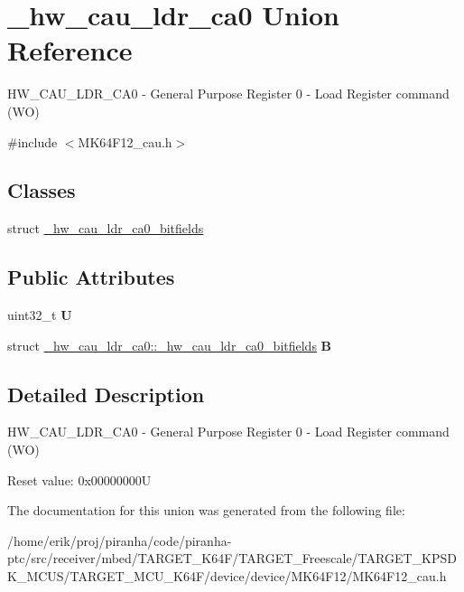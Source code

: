 \hypertarget{union__hw__cau__ldr__ca0}{}\section{\+\_\+hw\+\_\+cau\+\_\+ldr\+\_\+ca0 Union Reference}
\label{union__hw__cau__ldr__ca0}


H\+W\+\_\+\+C\+A\+U\+\_\+\+L\+D\+R\+\_\+\+C\+A0 -\/ General Purpose Register 0 -\/ Load Register command (WO)  




{\ttfamily \#include $<$M\+K64\+F12\+\_\+cau.\+h$>$}

\subsection*{Classes}
\begin{DoxyCompactItemize}
\item 
struct \hyperlink{struct__hw__cau__ldr__ca0_1_1__hw__cau__ldr__ca0__bitfields}{\+\_\+hw\+\_\+cau\+\_\+ldr\+\_\+ca0\+\_\+bitfields}
\end{DoxyCompactItemize}
\subsection*{Public Attributes}
\begin{DoxyCompactItemize}
\item 
uint32\+\_\+t {\bfseries U}\hypertarget{union__hw__cau__ldr__ca0_a4080128ee715578b75b81fc067d07aa3}{}\label{union__hw__cau__ldr__ca0_a4080128ee715578b75b81fc067d07aa3}

\item 
struct \hyperlink{struct__hw__cau__ldr__ca0_1_1__hw__cau__ldr__ca0__bitfields}{\+\_\+hw\+\_\+cau\+\_\+ldr\+\_\+ca0\+::\+\_\+hw\+\_\+cau\+\_\+ldr\+\_\+ca0\+\_\+bitfields} {\bfseries B}\hypertarget{union__hw__cau__ldr__ca0_a01a8ef5d1021d73221511a7ddb9f368a}{}\label{union__hw__cau__ldr__ca0_a01a8ef5d1021d73221511a7ddb9f368a}

\end{DoxyCompactItemize}


\subsection{Detailed Description}
H\+W\+\_\+\+C\+A\+U\+\_\+\+L\+D\+R\+\_\+\+C\+A0 -\/ General Purpose Register 0 -\/ Load Register command (WO) 

Reset value\+: 0x00000000U 

The documentation for this union was generated from the following file\+:\begin{DoxyCompactItemize}
\item 
/home/erik/proj/piranha/code/piranha-\/ptc/src/receiver/mbed/\+T\+A\+R\+G\+E\+T\+\_\+\+K64\+F/\+T\+A\+R\+G\+E\+T\+\_\+\+Freescale/\+T\+A\+R\+G\+E\+T\+\_\+\+K\+P\+S\+D\+K\+\_\+\+M\+C\+U\+S/\+T\+A\+R\+G\+E\+T\+\_\+\+M\+C\+U\+\_\+\+K64\+F/device/device/\+M\+K64\+F12/M\+K64\+F12\+\_\+cau.\+h\end{DoxyCompactItemize}
